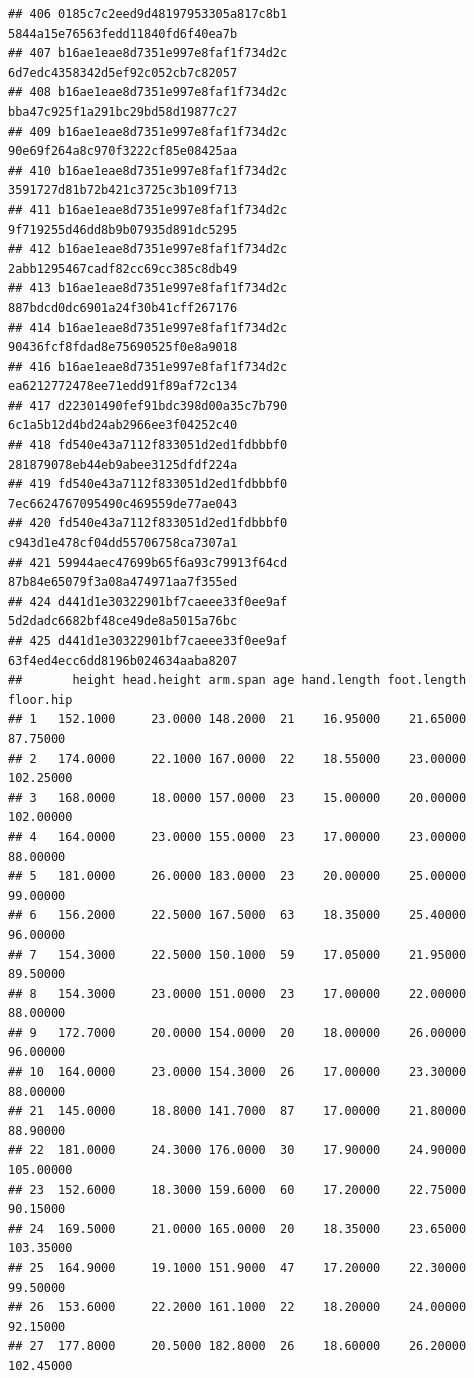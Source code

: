 \documentclass[]{article}
\begin{document}
\begin{verbatim}
## 406 0185c7c2eed9d48197953305a817c8b1   5844a15e76563fedd11840fd6f40ea7b
## 407 b16ae1eae8d7351e997e8faf1f734d2c   6d7edc4358342d5ef92c052cb7c82057
## 408 b16ae1eae8d7351e997e8faf1f734d2c   bba47c925f1a291bc29bd58d19877c27
## 409 b16ae1eae8d7351e997e8faf1f734d2c   90e69f264a8c970f3222cf85e08425aa
## 410 b16ae1eae8d7351e997e8faf1f734d2c   3591727d81b72b421c3725c3b109f713
## 411 b16ae1eae8d7351e997e8faf1f734d2c   9f719255d46dd8b9b07935d891dc5295
## 412 b16ae1eae8d7351e997e8faf1f734d2c   2abb1295467cadf82cc69cc385c8db49
## 413 b16ae1eae8d7351e997e8faf1f734d2c   887bdcd0dc6901a24f30b41cff267176
## 414 b16ae1eae8d7351e997e8faf1f734d2c   90436fcf8fdad8e75690525f0e8a9018
## 416 b16ae1eae8d7351e997e8faf1f734d2c   ea6212772478ee71edd91f89af72c134
## 417 d22301490fef91bdc398d00a35c7b790   6c1a5b12d4bd24ab2966ee3f04252c40
## 418 fd540e43a7112f833051d2ed1fdbbbf0   281879078eb44eb9abee3125dfdf224a
## 419 fd540e43a7112f833051d2ed1fdbbbf0   7ec6624767095490c469559de77ae043
## 420 fd540e43a7112f833051d2ed1fdbbbf0   c943d1e478cf04dd55706758ca7307a1
## 421 59944aec47699b65f6a93c79913f64cd   87b84e65079f3a08a474971aa7f355ed
## 424 d441d1e30322901bf7caeee33f0ee9af   5d2dadc6682bf48ce49de8a5015a76bc
## 425 d441d1e30322901bf7caeee33f0ee9af   63f4ed4ecc6dd8196b024634aaba8207
##       height head.height arm.span age hand.length foot.length floor.hip
## 1   152.1000     23.0000 148.2000  21    16.95000    21.65000  87.75000
## 2   174.0000     22.1000 167.0000  22    18.55000    23.00000 102.25000
## 3   168.0000     18.0000 157.0000  23    15.00000    20.00000 102.00000
## 4   164.0000     23.0000 155.0000  23    17.00000    23.00000  88.00000
## 5   181.0000     26.0000 183.0000  23    20.00000    25.00000  99.00000
## 6   156.2000     22.5000 167.5000  63    18.35000    25.40000  96.00000
## 7   154.3000     22.5000 150.1000  59    17.05000    21.95000  89.50000
## 8   154.3000     23.0000 151.0000  23    17.00000    22.00000  88.00000
## 9   172.7000     20.0000 154.0000  20    18.00000    26.00000  96.00000
## 10  164.0000     23.0000 154.3000  26    17.00000    23.30000  88.00000
## 21  145.0000     18.8000 141.7000  87    17.00000    21.80000  88.90000
## 22  181.0000     24.3000 176.0000  30    17.90000    24.90000 105.00000
## 23  152.6000     18.3000 159.6000  60    17.20000    22.75000  90.15000
## 24  169.5000     21.0000 165.0000  20    18.35000    23.65000 103.35000
## 25  164.9000     19.1000 151.9000  47    17.20000    22.30000  99.50000
## 26  153.6000     22.2000 161.1000  22    18.20000    24.00000  92.15000
## 27  177.8000     20.5000 182.8000  26    18.60000    26.20000 102.45000

\end{verbatim}
\end{document}

